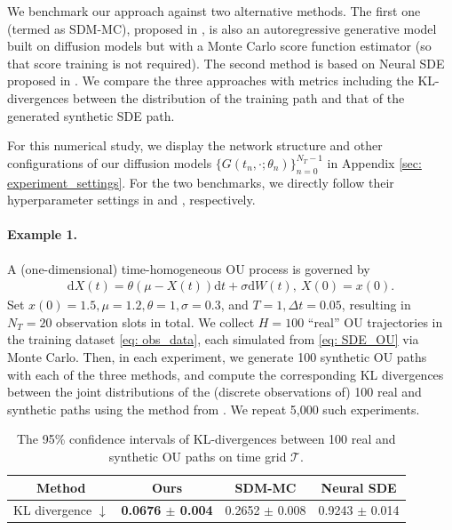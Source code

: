 \documentclass[11pt]{article}
\newcommand{\tbf}{\textbf}
\newcommand{\intd}{\mathrm{d}}
\begin{document}
We benchmark our approach against two alternative methods. The first one (termed as SDM-MC), proposed in \cite{liu2025training}, is also an autoregressive generative model built on diffusion models but with a Monte Carlo score function estimator (so that score training is not required). The second method is based on Neural SDE proposed in \cite{kidger2021neural}. We compare the three approaches with metrics including the KL-divergences between the distribution of the training path and that of the generated synthetic SDE path.

For this numerical study, we display the network structure and other configurations of our diffusion models  $\{G(t_n, \cdot; \theta_n)\}_{n=0}^{N_T - 1}$ in Appendix \ref{sec: experiment_settings}.
For the two benchmarks, we directly follow their hyperparameter settings in \cite{liu2025training} and \cite{kidger2021neural}, respectively.




\paragraph{Example 1.}
A (one-dimensional) time-homogeneous OU process is governed by
\begin{align}\label{eq: SDE_OU}
    \intd X(t) = \theta (\mu - X(t)) \intd t + \sigma \intd W(t),\ X(0) = x(0).
\end{align}
Set $x(0) = 1.5, \mu=1.2, \theta = 1, \sigma=0.3$, and $T = 1, \Delta t = 0.05$, resulting in $N_T = 20$ observation slots in total. We collect $H = 100$ ``real'' OU trajectories
in the training dataset \eqref{eq: obs_data}, each simulated from \eqref{eq: SDE_OU} via Monte Carlo. Then, in each experiment, we generate 100 synthetic OU paths with each of the three methods, and compute the corresponding KL divergences between the joint distributions of the (discrete observations of) 100 real and synthetic paths using the method from \cite{wang2009divergence}. We repeat 5,000 such experiments.

\begin{table}[htp]
    \centering
    \begin{tabular}{c | c c c}
    \toprule
     Method & Ours & SDM-MC & Neural SDE\\
     \midrule
     KL divergence $\downarrow$ & \tbf{0.0676 $\pm$ 0.004} & 0.2652 $\pm$ 0.008 & 0.9243 $\pm$ 0.014\\
    \bottomrule
    \end{tabular}
    \caption{The 95\% confidence intervals of KL-divergences between 100 real and synthetic OU paths on time grid $\mathcal{T}$.}
    \label{table: OU_KL}
\end{table}
\end{document}
